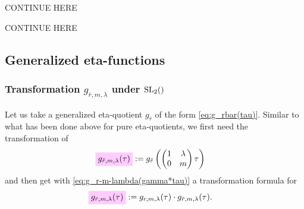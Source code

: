 \documentclass{article}
\begin{document}
\begin{Hemmecke}
  CONTINUE HERE
\end{Hemmecke}
\begin{Hemmecke}
  CONTINUE HERE
\end{Hemmecke}








\subsection{Generalized eta-functions}




\subsubsection{Transformation $g_{\bar{r},m,\lambda}$ under $\SL2Z$}

Let us take a generalized eta-quotient $g_{\bar{r}}$ of the form
\eqref{eq:g_rbar(tau)}.
Similar to what has been done above for pure eta-quotients, we first
need the transformation of
\begin{align}
  \defineNotation[g-rtilde-m-lambda-tau]{g_{\tilde{r},m,\lambda}(\tau)}
  &:=
  g_{\tilde{r}}
    \left(
    \begin{pmatrix}1&\lambda\\0&m\end{pmatrix}\tau
    \right)
  \label{eq:g_rtilde-m-lambda(tau)}
\end{align}
and then get with \eqref{eq:g_r-m-lambda(gamma*tau)} a transformation
formula for
\begin{align}
  \defineNotation[g-rbar-m-lambda-tau]{g_{\bar{r},m,\lambda}(\tau)}
  &:=
    g_{r,m,\lambda}(\tau)
    \cdot
    g_{\tilde{r},m,\lambda}(\tau).
  \label{eq:g_rbar-m-lambda(tau)}
\end{align}
\end{document}
